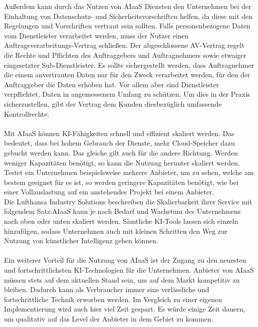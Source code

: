 Außerdem kann durch das Nutzen von AIaaS Diensten den Unternehmen bei der Einhaltung von Datenschutz- und Sicherheitsvorschriften helfen, da diese mit den Regelungen und Vorschriften vertraut sein sollten. Falls personenbezogene Daten vom Dienstleister verarbeitet werden, muss der Nutzer einen Auftragsverarbeitungs-Vertrag schließen. Der abgeschlossene AV-Vertrag regelt die Rechte und Pflichten des Auftraggebers und Auftragnehmers sowie etwaiger eingesetzter Sub-Dienstleister. Es sollte sichergestellt werden, dass  Auftragnehmer die einem anvertrauten Daten nur für den Zweck verarbeitet werden, für den der Auftraggeber die Daten erhoben hat. Vor allem aber sind Dienstleister verpflichtet,  Daten in angemessenem Umfang zu schützen. Um dies in der Praxis sicherzustellen, gibt der Vertrag dem Kunden diesbezüglich umfassende Kontrollrechte. \cite[vgl.][]{ActiveMindAG.2022} \\ \\
Mit AIaaS können KI-Fähigkeiten schnell und effizient skaliert werden. Das bedeutet, dass bei hohem Gebrauch der Dienste, mehr Cloud-Speicher dazu gebucht werden kann. Das gleiche gilt auch für die andere Richtung. Werden weniger Kapazitäten benötigt, so kann die Nutzung herunter skaliert werden. Testet ein Unternehmen beispielsweise mehrere Anbieter, um zu sehen, welche am bestem geeignet für es ist, so werden geringere Kapazitäten benötigt, wie bei einer Vollauslastung auf ein anstehendes Projekt bei einem Anbieter. \cite[vgl.][]{Cuofano.2022} \\
Die Lufthansa Industry Solutions beschreiben die Skalierbarkeit ihrer Service mit folgendem Satz:\glqq AIaaS kann je nach Bedarf und Wachstum des Unternehmens nach oben oder unten skaliert werden. Sämtliche KI-Tools lassen sich einzeln hinzufügen, sodass Unternehmen auch mit kleinen Schritten den Weg zur Nutzung von künstlicher Intelligenz gehen können\grqq. \cite[vgl.][]{LIS.2022} \\ \\
Ein weiterer Vorteil für die Nutzung von AIaaS ist der Zugang zu den neuesten und fortschrittlichsten KI-Technologien für die Unternehmen. Anbieter von AIaaS müssen stets auf dem aktuellen Stand sein, um auf dem Markt kompetitiv zu bleiben. Dadurch kann als Verbraucher immer eine verlässliche und fortschrittliche Technik erworben werden. Im Vergleich zu einer eigenen Implementierung wird auch hier viel Zeit gespart. Es würde einige Zeit dauern, um qualitativ auf das Level der Anbieter in dem Gebiet zu kommen. \cite[vgl.][]{Folio.2022} \\ \\
